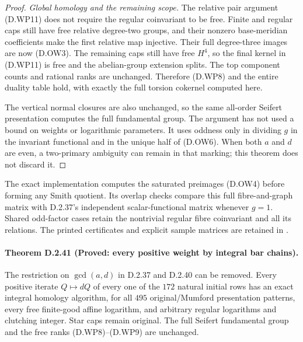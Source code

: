\begin{proof}
\emph{Global homology and the remaining scope.}
The relative pair argument (D.WP11) does not
require the regular coinvariant to be free.
Finite and regular caps still have free
relative degree-two groups, and their
nonzero base-meridian coefficients make the
first relative map injective. Their full
degree-three images are now (D.OW3).
The remaining caps still have free
$H^4$, so the final kernel in (D.WP11) is
free and the abelian-group extension splits.
The top component counts and rational ranks
are unchanged. Therefore (D.WP8) and the
entire duality table hold, with exactly the
full torsion cokernel computed here.

The vertical normal closures are also unchanged,
so the same all-order Seifert presentation
computes the full fundamental group.
The argument has not used a bound on weights
or logarithmic parameters. It uses oddness
only in dividing $g$ in the invariant functional
and in the unique half of (D.OW6). When both
$a$ and $d$ are even, a two-primary ambiguity
can remain in that marking; this theorem
does not discard it.
\end{proof}

The exact implementation computes the saturated
preimages (D.OW4) before forming any Smith quotient.
Its overlap checks compare this full fibre-and-graph
matrix with D.2.37's independent scalar-functional
matrix whenever $g=1$. Shared odd-factor cases
retain the nontrivial regular fibre coinvariant
and all its relations. The printed certificates
and explicit sample matrices are retained in
.


\paragraph{Theorem D.2.41 (Proved: every positive weight by integral bar chains).}
The restriction on $\gcd(a,d)$ in D.2.37 and D.2.40 can
be removed. Every positive iterate $Q\mapsto dQ$ of
every one of the $172$ natural initial rows has an
exact integral homology algorithm, for all $495$
original/Mumford presentation patterns, every free
finite-good affine logarithm, and arbitrary regular
logarithms and clutching integer. Star caps remain
original. The full Seifert fundamental group and
the free ranks (D.WP8)--(D.WP9) are unchanged.


